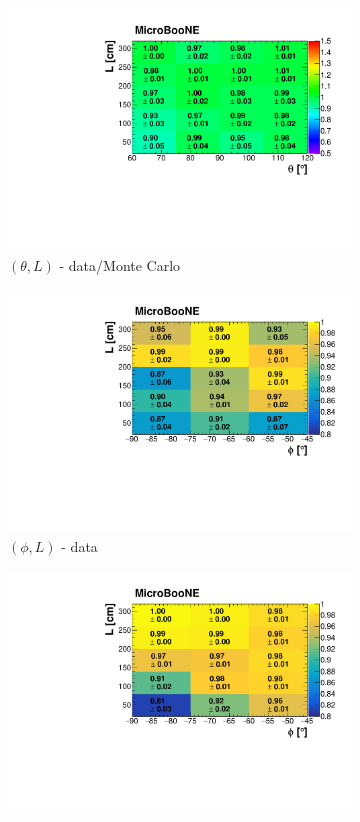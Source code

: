 \documentclass[a4paper,11pt]{article}
\begin{document}
\begin{figure}[htbp]
\begin{subfigure}{0.32\textwidth}
\includegraphics[width=\linewidth]{figures/theta_l.pdf}
\caption{$(\theta,L)$ - data/Monte Carlo}
\end{subfigure}
\begin{subfigure}{0.32\textwidth}
  \includegraphics[width=\linewidth]{figures/e_phi_l.pdf}
  \caption{$(\phi,L)$ - data}
\end{subfigure}\begin{subfigure}{0.32\textwidth}
\includegraphics[width=\linewidth]{figures/phi_l_mc.pdf}

\end{subfigure}
\end{figure}
\end{document}
